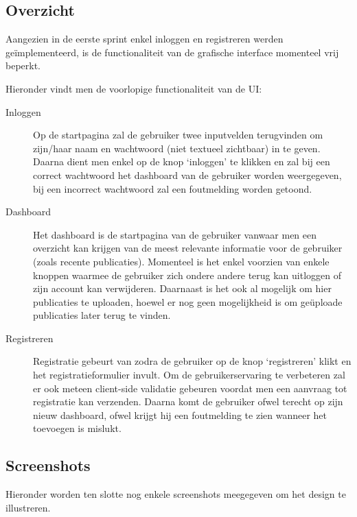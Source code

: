 \documentclass{article}
\begin{document}
\subsection{Overzicht}

Aangezien in de eerste sprint enkel inloggen en registreren werden ge\"implementeerd, is de functionaliteit van de grafische interface momenteel vrij beperkt. 

Hieronder vindt men de voorlopige functionaliteit van de UI:

\begin{description}

\item[Inloggen] Op de startpagina zal de gebruiker twee inputvelden terugvinden om zijn/haar naam en wachtwoord (niet textueel zichtbaar) in te geven. Daarna dient men enkel op de knop `inloggen' te klikken en zal bij een correct wachtwoord het dashboard van de gebruiker worden weergegeven, bij een incorrect wachtwoord zal een foutmelding worden getoond.

\item[Dashboard] Het dashboard is de startpagina van de gebruiker vanwaar men een overzicht kan krijgen van de meest relevante informatie voor de gebruiker (zoals recente publicaties). Momenteel is het enkel voorzien van enkele knoppen waarmee de gebruiker zich ondere andere terug kan uitloggen of zijn account kan verwijderen. Daarnaast is het ook al mogelijk om hier publicaties te uploaden, hoewel er nog geen mogelijkheid is om ge\"uploade publicaties later terug te vinden.

\item[Registreren] Registratie gebeurt van zodra de gebruiker op de knop `registreren' klikt en het registratieformulier invult. Om de gebruikerservaring te verbeteren zal er ook meteen client-side validatie gebeuren voordat men een aanvraag tot registratie kan verzenden. Daarna komt de gebruiker ofwel terecht op zijn nieuw dashboard, ofwel krijgt hij een foutmelding te zien wanneer het toevoegen is mislukt.

\end{description}

\subsection{Screenshots}

Hieronder worden ten slotte nog enkele screenshots meegegeven om het design te illustreren. 
\end{document}
